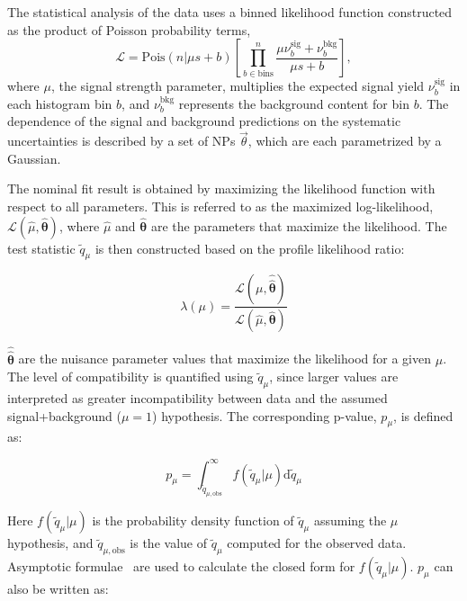 The statistical analysis of the data uses a binned likelihood function constructed as the product of Poisson probability terms,
\begin{equation}
\mathcal{L} = 
\text{Pois}(n|\mu s+b)\left[\prod_{b\in \text{bins}}^{n}
\frac{\mu \nu_{b}^{\text{sig}} + \nu_{b}^{\text{bkg}}}{\mu s+b} \right],
\end{equation}
where $\mu$, the signal strength parameter, multiplies the expected signal yield $\nu_{b}^{\text{sig}}$ in each histogram bin $b$, and $\nu_{b}^{\text{bkg}}$ represents the background content for bin $b$. The dependence of the signal and background predictions on the systematic uncertainties is described by a set of NPs $\vec{\theta}$, which are each parametrized by a Gaussian. 

The nominal fit result is obtained by maximizing the likelihood function with respect to all parameters. This is referred to as the maximized log-likelihood, $\mathcal{L}(\hat{\mu}, \hat{\boldsymbol{\theta}})$, where $\hat\mu$ and $\hat{\boldsymbol{\theta}}$ are the parameters that maximize the likelihood. The test statistic $\tilde q_\mu$ is then constructed based on the profile likelihood ratio:

\begin{equation}
\lambda(\mu) = \frac{\mathcal{L}(\mu, \hat{\hat{\boldsymbol{\theta}}})}{\mathcal{L}(\hat{\mu}, \hat{\boldsymbol{\theta}})}
\label{eqn:proflike}
\end{equation}

\noindent $\hat{\hat{\boldsymbol{\theta}}}$ are the nuisance parameter values that maximize the likelihood for a given $\mu$. The level of compatibility is quantified using $\tilde q_\mu$, since larger values are interpreted as greater incompatibility between data and the assumed signal+background ($\mu=1$) hypothesis. The corresponding p-value, $p_\mu$, is defined as:

\begin{equation}
p_\mu = \int_{\tilde{q}_{\mu,\text{obs}}}^\infty f(\tilde{q}_\mu | \mu) \text{d}\tilde{q}_\mu
\label{eqn:pmu}
\end{equation}

\noindent Here $f(\tilde{q}_\mu | \mu)$ is the probability density function of $\tilde{q}_\mu$ assuming the $\mu$ hypothesis, and $\tilde{q}_{\mu,\text{obs}}$ is the value of $\tilde{q}_\mu$ computed for the observed data.
Asymptotic formulae~\cite{Cowan:2010js} are used to calculate the closed form for $f(\tilde{q}_\mu | \mu)$. $p_\mu$ can also be written as:

